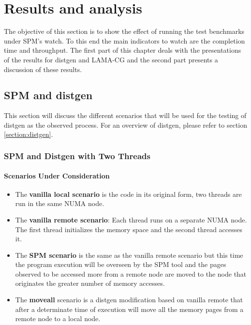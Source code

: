 \chapter{Results and analysis}\label{chapter:res-analysis}
The objective of this section is to show the effect of running the test benchmarks under SPM's watch. To this end the main indicators to watch are the completion time and throughput. The first part of this chapter deals with the presentations of the results for distgen and LAMA-CG and the second part presents a discussion of these results.
 
\section{SPM and distgen}\label{section:spmydistgen}
This section will discuss the different scenarios that will be used for the testing of distgen as the observed process. For an overview of distgen, please refer to section \ref{section:distgen}.
\subsection{SPM and Distgen with Two Threads}\label{subsection:res-spmydistgen-2t}

\subsubsection{Scenarios Under Consideration}\label{subsection:res-scenarios-2t-scens}

\begin{itemize}
	\item The \textbf{vanilla local scenario} is the code in its original form, two threads are run in the same NUMA node.
	\item The \textbf{vanilla remote scenario}: Each thread runs on a separate NUMA node. The first thread initializes the memory space and the second thread accesses it. 
	\item The \textbf{SPM scenario} is the same as the vanilla remote scenario but this time the program execution will be overseen by the SPM tool and the pages observed to be accessed more from a remote node are moved to the node that originates the greater number of memory accesses.
	\item The \textbf{moveall} scenario is a distgen modification based on vanilla remote that after a determinate time of execution will move all the memory pages from a remote node to a local node.
\end{itemize}

